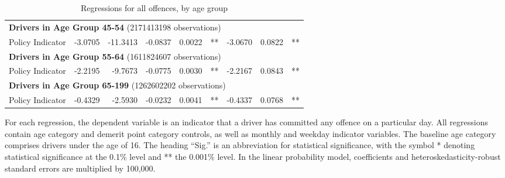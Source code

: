 \begin{table}
\begin{tabular}{l r r r r l r r l}
\hline 

\multicolumn{8}{l}{\textbf{Drivers in Age Group 45-54} (2171413198 observations)} \\ 

Policy Indicator        &  -3.0705        &  -11.3413       &  -0.0837        &  0.0022       &   **       &  -3.0670        &  0.0822       &   **       \\ 

\hline 

\multicolumn{8}{l}{\textbf{Drivers in Age Group 55-64} (1611824607 observations)} \\ 

Policy Indicator        &  -2.2195        &  -9.7673       &  -0.0775        &  0.0030       &   **       &  -2.2167        &  0.0843       &   **       \\ 

\hline 

\multicolumn{8}{l}{\textbf{Drivers in Age Group 65-199} (1262602202 observations)} \\ 

Policy Indicator        &  -0.4329        &  -2.5930       &  -0.0232        &  0.0041       &   **       &  -0.4337        &  0.0768       &   **       \\ 

\hline 

\end{tabular} 
\caption{Regressions for all offences, by age group} 
For each regression, the dependent variable is an indicator that a driver has committed  
any offence on a particular day.  
All regressions contain age category and demerit point category controls, 
as well as monthly and weekday indicator variables. 
The baseline age category comprises drivers under the age of 16. 
The heading ``Sig.'' is an abbreviation for statistical significance, with 
the symbol * denoting statistical significance at the 0.1\% level 
and ** the 0.001\% level. 
In the linear probability model, coefficients and heteroskedasticity-robust standard errors are  
multiplied by 100,000.  
\label{tab:seas_Logit_vs_LPMx100K_regs_by_age} 
\end{table} 
 
